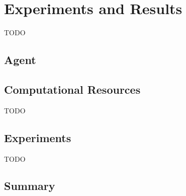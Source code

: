 \documentclass[../xlapes02]{subfiles}
\begin{document}
    \chapter{Experiments and Results}\label{sec:experiments-and-results}
    TODO
    \section{Agent}\label{sec:agents}


    \section{Computational Resources}\label{sec:computational-resources}
    TODO


    \section{Experiments}\label{sec:experiments}
    TODO


    \section{Summary}\label{sec:summary}
\end{document}
